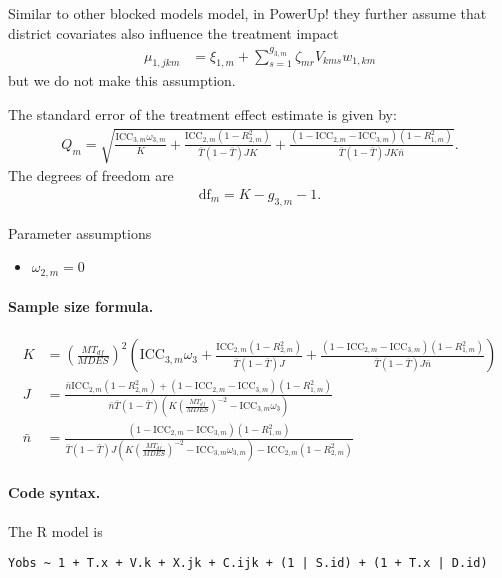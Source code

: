 \documentclass[12pt]{article}
\begin{document}
Similar to other blocked models model, in PowerUp! they further assume that district covariates also influence the treatment impact
\begin{align*}
\mu_{1,jkm} &= \xi_{1,m} + \sum_{s=1}^{g_{3,m}} \zeta_{mr} V_{kms} w_{1,km}
\end{align*}
but we do not make this assumption.

The standard error of the treatment effect estimate is given by:
\begin{align}
Q_m = \sqrt{
\frac{\text{ICC}_{3,m} \omega_{3,m}}{K} +
\frac{\text{ICC}_{2,m}(1 - R^2_{2,m})}{\bar{T}(1 - \bar{T}) J K } +
\frac{(1-\text{ICC}_{2,m} - \text{ICC}_{3,m})(1-R^2_{1,m})}{\bar{T}(1 - \bar{T}) J K\bar{n}} }.\end{align}
The degrees of freedom are
\begin{align}\text{df}_m = K - g_{3,m} - 1.\end{align}

Parameter assumptions
\begin{itemize}
\item $\omega_{2,m} = 0$
\end{itemize}


\paragraph{Sample size formula.} 
\begin{align}
K &= \left(\frac{MT_{df}}{MDES}\right)^2 \left( \text{ICC}_{3,m} \omega_3  +  \frac{\text{ICC}_{2,m} (1-R_{2,m}^2)}{\bar{T}(1 - \bar{T}) J} + \frac{(1-\text{ICC}_{2,m}-\text{ICC}_{3,m})(1-R^2_{1,m})}{\bar{T}(1 - \bar{T}) J \bar{n}} \right)\\
J &=  \frac{\bar{n}\text{ICC}_{2,m} (1-R_{2,m}^2) + (1-\text{ICC}_{2,m}-\text{ICC}_{3,m})(1-R^2_{1,m})}{\bar{n} \bar{T}(1 - \bar{T})\left( K \left(\frac{MT_{df}}{MDES}\right)^{-2} -  \text{ICC}_{3,m} \omega_3\right)}\\
\bar{n} &= \frac{(1-\text{ICC}_{2,m}-\text{ICC}_{3,m})(1-R^2_{1,m})}{\bar{T}(1 - \bar{T})J \left(K \left(\frac{MT_{df}}{MDES}\right)^{-2} -  \text{ICC}_{3,m}\omega_{3,m}\right) -  \text{ICC}_{2,m} (1-R_{2,m}^2)}
\end{align}

\paragraph{Code syntax.}
The R model is
\begin{verbatim}
Yobs ~ 1 + T.x + V.k + X.jk + C.ijk + (1 | S.id) + (1 + T.x | D.id)
\end{verbatim}
\end{document}

